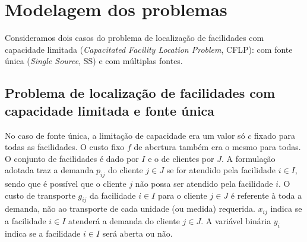 \documentclass[]{article}
\title{}
\begin{document}
\maketitle

\begin{abstract}

\end{abstract}


\section{Modelagem dos problemas}

	Consideramos dois casos do problema de localização de facilidades com capacidade limitada 
	(\textit{Capacitated Facility Location Problem}, CFLP):
	com fonte única (\textit{Single Source}, SS) 
	e com múltiplas fontes. 
	
	\subsection{Problema de localização de facilidades com capacidade limitada e fonte única}
	
	No caso de fonte única, a limitação de capacidade era um valor só $c$ fixado para todas as facilidades.
	O custo fixo $f$ de abertura também era o mesmo para todas.
	O conjunto de facilidades é dado por $I$ e o de clientes por $J$.
	A formulação adotada traz a demanda $p_{ij}$ do cliente $j \in J$ se for atendido pela facilidade $i \in I$, 
	sendo que é possível que o cliente $j$ não possa ser atendido pela facilidade $i$.
	O custo de transporte $g_{ij}$ da facilidade $i \in I$ para o cliente $j \in J$ é referente à toda a demanda, não ao transporte de cada unidade (ou medida) requerida.
	$x_{ij}$ indica se a facilidade $i \in I$ atenderá a demanda do cliente $j \in J$.
	A variável binária $y_i$ indica se a facilidade $i \in I$ será aberta ou não.
	
	
\end{document}
